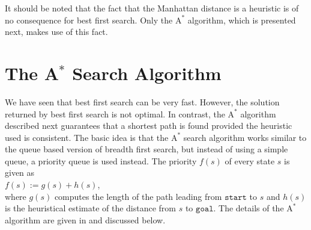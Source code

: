 It should be noted that the fact that the Manhattan distance is a  heuristic is of
no consequence for best first search.  Only the $\mathrm{A}^*$ algorithm, which is presented next, makes use of
this fact.

\section{The A$^*$ Search Algorithm}
We have seen that best first search can be very fast.  However, the solution returned by best first search is
not optimal.  In contrast, the $\mathrm{A}^*$ algorithm described next guarantees that a shortest path is found
provided the heuristic used is consistent.   The basic idea is that the
$\mathrm{A}^*$ search algorithm works similar to the queue based version of breadth first search, but instead
of using a simple queue, a priority queue is used instead.  The priority $f(s)$ of every state $s$ is given as
\\[0.2cm]
\hspace*{1.3cm}
$f(s) := g(s) + h(s)$,
\\[0.2cm]
where $g(s)$ computes the length of the path leading from $\mathtt{start}$ to $s$ and $h(s)$ is the heuristical
estimate of the distance from $s$ to $\mathtt{goal}$.  The details of the $\mathrm{A}^*$ algorithm are given in
 and discussed below.


